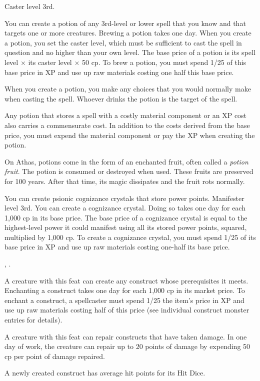 
{}
{Caster level 3rd.}
{You can create a potion of any 3rd-level or lower spell that you know and that targets one or more creatures. Brewing a potion takes one day. When you create a potion, you set the caster level, which must be sufficient to cast the spell in question and no higher than your own level. The base price of a potion is its spell level $\times$ its caster level $\times$ 50 cp. To brew a potion, you must spend 1/25 of this base price in XP and use up raw materials costing one half this base price.

When you create a potion, you make any choices that you would normally make when casting the spell. Whoever drinks the potion is the target of the spell.

Any potion that stores a spell with a costly material component or an XP cost also carries a commensurate cost. In addition to the costs derived from the base price, you must expend the material component or pay the XP when creating the potion.}
{}
{On Athas, potions come in the form of an enchanted fruit, often called a \emph{potion fruit}. The potion is consumed or destroyed when used. These fruits are preserved for 100 years. After that time, its magic dissipates and the fruit rots normally.}

{You can create psionic cognizance crystals that store power points.}
{Manifester level 3rd.}
{You can create a cognizance crystal. Doing so takes one day for each 1,000 cp in its base price. The base price of a cognizance crystal is equal to the highest-level power it could manifest using all its stored power points, squared, multiplied by 1,000 cp. To create a cognizance crystal, you must spend 1/25 of its base price in XP and use up raw materials costing one-half its base price.}{}{}

{, .}
{A creature with this feat can create any construct whose prerequisites it meets. Enchanting a construct takes one day for each 1,000 cp in its market price. To enchant a construct, a spellcaster must spend 1/25 the item's price in XP and use up raw materials costing half of this price (see individual construct monster entries for details).

A creature with this feat can repair constructs that have taken damage. In one day of work, the creature can repair up to 20 points of damage by expending 50 cp per point of damage repaired.

A newly created construct has average hit points for its Hit Dice.}

